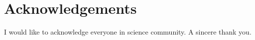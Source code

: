 \chapter*{Acknowledgements}

I would like to acknowledge everyone in science community. A sincere thank you.

\cleardoublepage
